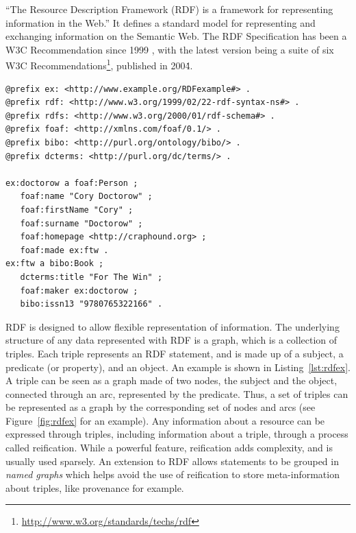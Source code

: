 ``The Resource Description Framework (RDF) is a framework for representing information in the Web.'' \cite{Klyne2004} It defines a standard model for representing and exchanging information on the Semantic Web. The RDF Specification has been a W3C Recommendation since 1999 \cite{Lassila1999}, with the latest version being a suite of six W3C Recommendations\footnote{\url{http://www.w3.org/standards/techs/rdf}}, published in 2004̇. 

\setlength\parindent{0in}
\begin{minipage}[htb]{\linewidth}
\begin{lstlisting}
@prefix ex: <http://www.example.org/RDFexample#> .
@prefix rdf: <http://www.w3.org/1999/02/22-rdf-syntax-ns#> .
@prefix rdfs: <http://www.w3.org/2000/01/rdf-schema#> .
@prefix foaf: <http://xmlns.com/foaf/0.1/> .
@prefix bibo: <http://purl.org/ontology/bibo/> .
@prefix dcterms: <http://purl.org/dc/terms/> .

ex:doctorow a foaf:Person ;
   foaf:name "Cory Doctorow" ;
   foaf:firstName "Cory" ;
   foaf:surname "Doctorow" ;
   foaf:homepage <http://craphound.org> ;
   foaf:made ex:ftw .
ex:ftw a bibo:Book ;
   dcterms:title "For The Win" ;
   foaf:maker ex:doctorow ;
   bibo:issn13 "9780765322166" .
\end{lstlisting}
\end{minipage}
\setlength\parindent{0.21in}

RDF is designed to allow flexible representation of information. The underlying structure of any data represented with RDF is a graph, which is a collection of triples. Each triple represents an RDF statement, and is made up of a subject, a predicate (or property), and an object. An example is shown in Listing~\ref{lst:rdfex}. A triple can be seen as a graph made of two nodes, the subject and the object, connected through an arc, represented by the predicate. Thus, a set of triples can be represented as a graph by the corresponding set of nodes and arcs (see Figure~\ref{fig:rdfex} for an example). 
Any information about a resource can be expressed through triples, including information about a triple, through a process called reification. While a powerful feature, reification adds complexity, and is usually used sparsely. An extension to RDF allows statements to be grouped in \emph{named graphs} which helps avoid the use of reification to store meta-information about triples, like provenance for example.


